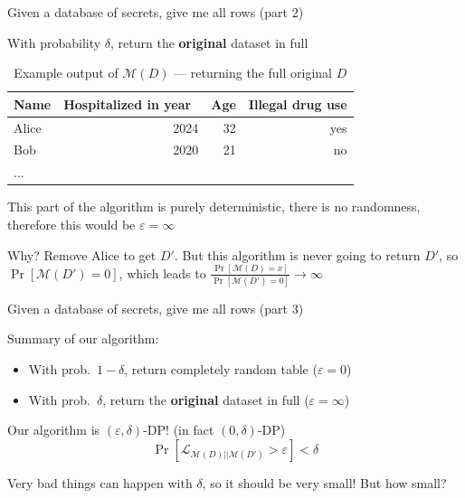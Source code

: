 \documentclass[12pt,aspectratio=169,handout]{beamer}
\begin{document}
\begin{frame}{Given a database of secrets, give me all rows (part 2)}

With probability $\delta$, return the \textbf{original} dataset in full

\begin{table}
\scriptsize
\begin{tabular}{lrrr} \toprule
Name & Hospitalized in year & Age & Illegal drug use \\ \midrule
Alice & 2024 & 32 & yes \\
Bob & 2020 & 21 & no \\
$\ldots$ & & & \\ \bottomrule
\end{tabular}
\caption{Example output of $\mathcal{M}(D)$ --- returning the full original $D$}
\end{table}

This part of the algorithm is purely deterministic, there is no randomness, therefore this would be $\varepsilon = \infty$

\footnotesize{Why? Remove Alice to get $D'$. But this algorithm is never going to return $D'$, so $\Pr[\mathcal{M}(D') = 0]$, which leads to $\frac{\Pr[\mathcal{M}(D) = x]}{\Pr[\mathcal{M}(D') = 0]} \to \infty$}

\end{frame}

\begin{frame}{Given a database of secrets, give me all rows (part 3)}

Summary of our algorithm:
\begin{itemize}
\item With prob.\ $1 - \delta$, return completely random table ($\varepsilon = 0$)
\item With prob.\ $\delta$, return the \textbf{original} dataset in full ($\varepsilon = \infty$)
\end{itemize}
Our algorithm is $(\varepsilon, \delta)$-DP! (in fact $(0, \delta)$-DP)
$$
\Pr\left[\mathcal{L}_{\mathcal{M}(D) || \mathcal{M}(D')} > \varepsilon \right] < \delta
$$

Very bad things can happen with $\delta$, so it should be very small! But how small?
\end{frame}
\end{document}
